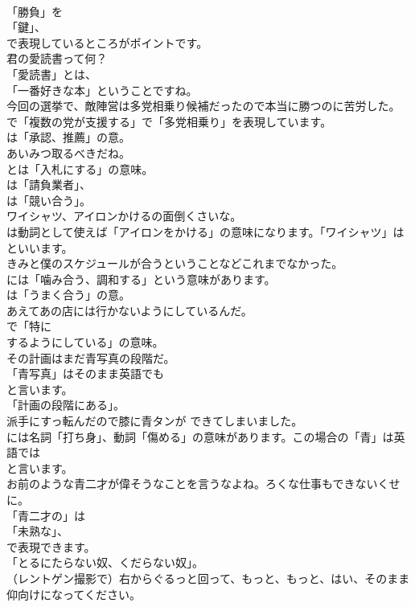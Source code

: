 \documentclass[8pt]{extreport}
\begin{document}
\begin{CJK}{UTF8}{min}
\\	「勝負」を
\\	「鍵」、
\\	で表現しているところがポイントです。	
\\	君の愛読書って何？ 
\\	「愛読書」とは、
\\	「一番好きな本」ということですね。	
\\	今回の選挙で、敵陣営は多党相乗り候補だったので本当に勝つのに苦労した。 
\\	で「複数の党が支援する」で「多党相乗り」を表現しています。
\\	は「承認、推薦」の意。	
\\	あいみつ取るべきだね。 
\\	とは「入札にする」の意味。
\\	は「請負業者」、
\\	は「競い合う」。	
\\	ワイシャツ、アイロンかけるの面倒くさいな。 
\\	は動詞として使えば「アイロンをかける」の意味になります。「ワイシャツ」は
\\	といいます。	
\\	きみと僕のスケジュールが合うということなどこれまでなかった。 
\\	には「噛み合う、調和する」という意味があります。
\\	は「うまく合う」の意。	
\\	あえてあの店には行かないようにしているんだ。 
\\	で「特に 
\\	するようにしている」の意味。	
\\	その計画はまだ青写真の段階だ。 
\\	「青写真」はそのまま英語でも
\\	と言います。
\\	「計画の段階にある」。	
\\	派手にすっ転んだので膝に青タンが できてしまいました。 
\\	には名詞「打ち身」、動詞「傷める」の意味があります。この場合の「青」は英語では
\\	と言います。	
\\	お前のような青二才が偉そうなことを言うなよね。ろくな仕事もできないくせに。 
\\	「青二才の」は
\\	「未熟な」、
\\	で表現できます。
\\	「とるにたらない奴、くだらない奴」。	
\\	（レントゲン撮影で）右からぐるっと回って、もっと、もっと、はい、そのまま仰向けになってください。 

\end{CJK}
\end{document}
